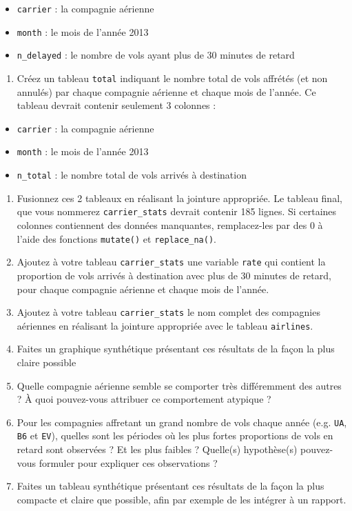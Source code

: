 \documentclass[a4paperpaper,]{article}
\providecommand{\tightlist}{%
  \setlength{\itemsep}{0pt}\setlength{\parskip}{0pt}}
\theoremstyle{definition}
\theoremstyle{definition}
\theoremstyle{definition}
\theoremstyle{remark}
\begin{document}
\begin{itemize}
\tightlist
\item
  \texttt{carrier} : la compagnie aérienne
\item
  \texttt{month} : le mois de l'année 2013
\item
  \texttt{n\_delayed} : le nombre de vols ayant plus de 30 minutes de
  retard
\end{itemize}

\begin{enumerate}
\def\labelenumi{\arabic{enumi}.}
\setcounter{enumi}{1}
\tightlist
\item
  Créez un tableau \texttt{total} indiquant le nombre total de vols
  affrétés (et non annulés) par chaque compagnie aérienne et chaque mois
  de l'année. Ce tableau devrait contenir seulement 3 colonnes :
\end{enumerate}

\begin{itemize}
\tightlist
\item
  \texttt{carrier} : la compagnie aérienne
\item
  \texttt{month} : le mois de l'année 2013
\item
  \texttt{n\_total} : le nombre total de vols arrivés à destination
\end{itemize}

\begin{enumerate}
\def\labelenumi{\arabic{enumi}.}
\setcounter{enumi}{2}
\item
  Fusionnez ces 2 tableaux en réalisant la jointure appropriée. Le
  tableau final, que vous nommerez \texttt{carrier\_stats} devrait
  contenir 185 lignes. Si certaines colonnes contiennent des données
  manquantes, remplacez-les par des 0 à l'aide des fonctions
  \texttt{mutate()} et \texttt{replace\_na()}.
\item
  Ajoutez à votre tableau \texttt{carrier\_stats} une variable
  \texttt{rate} qui contient la proportion de vols arrivés à destination
  avec plus de 30 minutes de retard, pour chaque compagnie aérienne et
  chaque mois de l'année.
\item
  Ajoutez à votre tableau \texttt{carrier\_stats} le nom complet des
  compagnies aériennes en réalisant la jointure appropriée avec le
  tableau \texttt{airlines}.
\item
  Faites un graphique synthétique présentant ces résultats de la façon
  la plus claire possible
\item
  Quelle compagnie aérienne semble se comporter très différemment des
  autres ? À quoi pouvez-vous attribuer ce comportement atypique ?
\item
  Pour les compagnies affretant un grand nombre de vols chaque année
  (e.g. \texttt{UA}, \texttt{B6} et \texttt{EV}), quelles sont les
  périodes où les plus fortes proportions de vols en retard sont
  observées ? Et les plus faibles ? Quelle(s) hypothèse(s) pouvez-vous
  formuler pour expliquer ces observations ?
\item
  Faites un tableau synthétique présentant ces résultats de la façon la
  plus compacte et claire que possible, afin par exemple de les intégrer
  à un rapport.
\end{enumerate}


\end{document}
